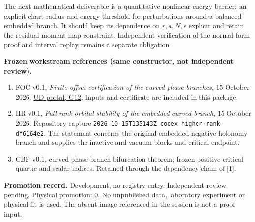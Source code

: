 \documentclass[11pt,a4paper]{article}
\begin{document}
The next mathematical deliverable is a quantitative nonlinear energy barrier: an explicit chart radius and energy threshold for perturbations around a balanced embedded branch. It should keep its dependence on $r,a,N,\epsilon$ explicit and retain the residual moment-map constraint. Independent verification of the normal-form proof and interval replay remains a separate obligation.

\textbf{Frozen workstream references (same constructor, not independent review).}
\begin{enumerate}
\item FOC v0.1, \emph{Finite-offset certification of the curved phase branches}, 15 October 2026. \href{https://unified-dynamics-public.ben-w-mayes.chatgpt.site/papers/\#finite-offset-v01}{UD portal, G12}. Inputs and certificate are included in this package.
\item HR v0.1, \emph{Full-rank orbital stability of the embedded curved branch}, 15 October 2026. Repository capture \texttt{2026-10-15T135143Z-codex-higher-rank-df6164e2}. The statement concerns the original embedded negative-holonomy branch and supplies the inactive and vacuum blocks and critical endpoint.
\item CBF v0.1, curved phase-branch bifurcation theorem; frozen positive critical quartic and scalar indices. Retained through the dependency chain of [1].
\end{enumerate}
\vfill
\textbf{Promotion record.} Development, no registry entry. Independent review: pending. Physical promotion: $0$. No unpublished data, laboratory experiment or physical fit is used. The absent image referenced in the session is not a proof input.
\end{document}
